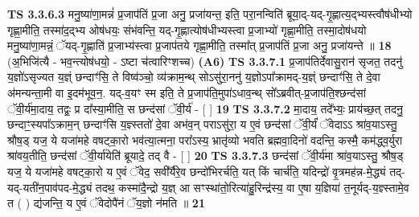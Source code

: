 \documentclass[17pt]{extarticle}
\begin{document}
                  \newline
                                \textbf{ TS 3.3.6.3} \newline
                  मनु॒ष्या॑णा॒मन्नं॑ प्र॒जाप॑तिं प्र॒जा अनु॒ प्रजा॑यन्त॒ इति॒ परा॒नन्विति॑ ब्रूया॒द्-यद्-गृ॒ह्णात्य॒द्भ्यस्त्वौष॑धीभ्यो गृह्णा॒मीति॒ तस्मा॑द॒द्भ्य ओष॑धयः॒ संभ॑वन्ति॒ यद्-गृ॒ह्णात्योष॑धीभ्यस्त्वा प्र॒जाभ्यो॑ गृह्णा॒मीति॒ तस्मा॒दोष॑धयो मनु॒ष्या॑णा॒मन्नं॒ ॅयद्-गृ॒ह्णाति॑ प्र॒जाभ्य॑स्त्वा प्र॒जाप॑तये गृह्णा॒मीति॒ तस्मा᳚त् प्र॒जाप॑तिं प्र॒जा अनु॒ प्रजा॑यन्ते ॥ \textbf{  18} \newline
                  \newline
                      (अ॒भिजि॑त्यै - भव॒न्त्योष॑धयो॒ - ऽष्टा च॑त्वारिꣳशच्च)  \textbf{(A6)} \newline \newline
                                        \textbf{ TS 3.3.7.1} \newline
                  प्र॒जाप॑तिर्देवासु॒रान॑ सृजत॒ तदनु॑ य॒ज्ञो॑ऽसृज्यत य॒ज्ञ्ं छन्दाꣳ॑सि॒ ते विष्व॑ञ्चो॒ व्य॑क्राम॒न्थ् सोऽसु॑रा॒ननु॑ य॒ज्ञोऽपा᳚क्रामद्-य॒ज्ञ्ं छन्दाꣳ॑सि॒ ते दे॒वा अ॑मन्यन्ता॒मी वा इ॒दम॑भूव॒न॒. यद्-व॒यꣳ स्म इति॒ ते प्र॒जाप॑ति॒मुपा॑ऽधाव॒न्थ् सो᳚ऽब्रवीत्-प्र॒जाप॑ति॒श्छन्द॑सां ॅवी॒र्य॑मा॒दाय॒ तद्वः॒ प्र दा᳚स्या॒मीति॒ स छन्द॑सां ॅवी॒र्य॑ - [  ] \textbf{  19} \newline
                  \newline
                                \textbf{ TS 3.3.7.2} \newline
                  मा॒दाय॒ तदे᳚भ्यः॒ प्राय॑च्छ॒त् तदनु॒ छन्दाꣳ॒॒स्यपा᳚ऽक्राम॒न् छन्दाꣳ॑सि य॒ज्ञ्स्ततो॑ दे॒वा अभ॑व॒न् पराऽसु॑रा॒ य ए॒वं छन्द॑सां ॅवी॒र्यं॑ ॅवेदाऽऽ श्रा॑व॒याऽस्तु॒ श्रौष॒ड् यज॒ ये यजा॑महे वषट्का॒रो भव॑त्या॒त्मना॒ परा᳚ऽस्य॒ भ्रातृ॑व्यो भवति ब्रह्मवा॒दिनो॑ वदन्ति॒ कस्मै॒ कम॑द्ध्व॒र्युरा श्रा॑वय॒तीति॒ छन्द॑सां ॅवी॒र्या॑येति॑ ब्रूयादे॒ तद् वै - [  ] \textbf{  20} \newline
                  \newline
                                \textbf{ TS 3.3.7.3} \newline
                  छन्द॑सां ॅवी॒र्य॑मा श्रा॑व॒याऽस्तु॒ श्रौष॒ड् यज॒ ये यजा॑महे वषट्का॒रो य ए॒वं ॅवेद॒ सवी᳚र्यैरे॒व छन्दो॑भिरर्चति॒ यत् किं चार्च॑ति॒ यदिन्द्रो॑ वृ॒त्रमह॑न्न-मे॒द्ध्यं तद्-यद्-यती॑न॒पाव॑पद-मे॒द्ध्यं तदथ॒ कस्मा॑दै॒न्द्रो य॒ज्ञ् आ सꣳस्था॑तो॒रित्या॑हु॒रिन्द्र॑स्य॒ वा ए॒षा य॒ज्ञिया॑ त॒नूर्यद्-य॒ज्ञ्स्तामे॒व त ( ) द्य॑जन्ति॒ य ए॒वं ॅवेदोपै॑नं ॅय॒ज्ञो न॑मति ॥ \textbf{  21} \newline
                  \newline
\end{document}
